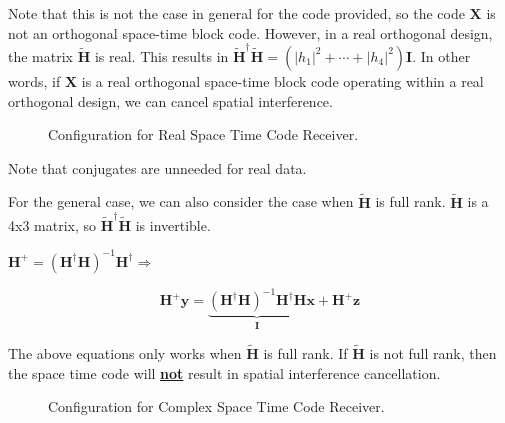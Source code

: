 \documentclass[fleqn]{article}
\begin{document}
\begin{enumerate}
\begin{enumerate}
			Note that this is not the case in general for the code provided, so the code $\mathbf{X}$ is not an orthogonal space-time block code. However, in a real orthogonal design, the matrix $\mathbf{\tilde{H}}$ is real. This results in $\mathbf{\tilde{H}^\dagger\tilde{H}} = (|h_1|^2 + \cdots + |h_4|^2)\mathbf{I}$. In other words, if $\mathbf{X}$ is a real orthogonal space-time block code operating within a real orthogonal design, we can cancel spatial interference.
			
			\begin{figure}[H]
				\centerline{}
				\caption{Configuration for Real Space Time Code Receiver.}
				\label{fig::real_space_time_code}
			\end{figure}
			
			Note that conjugates are unneeded for real data.
			
			For the general case, we can also consider the case when $\mathbf{\tilde{H}}$ is full rank. $\mathbf{\tilde{H}}$ is a 4x3 matrix, so $\mathbf{\tilde{H}^{\dagger}\tilde{H}}$ is invertible. 
			
			$\mathbf{H^+} = (\mathbf{H^{\dagger}H})^{-1}\mathbf{H^{\dagger}} \Rightarrow$
			
			\begin{equation*}
				\mathbf{H^+y} = \underbrace{(\mathbf{H^{\dagger}H})^{-1}\mathbf{H^{\dagger}H}}_{\mathbf{I}}\mathbf{x} + \mathbf{H^+z}
			\end{equation*}
			 
			The above equations only works when $\mathbf{\tilde{H}}$ is full rank. If  $\mathbf{\tilde{H}}$ is not full rank, then the space time code will \textbf{\underline{not}} result in spatial interference cancellation.
			
			\begin{figure}[H]
				\centerline{}
				\caption{Configuration for Complex Space Time Code Receiver.}
				\label{fig::complex_space_time_code}
			\end{figure}
			

\end{enumerate}
\end{enumerate}
\end{document}
